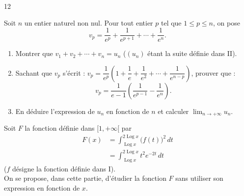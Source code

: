 \documentclass{axiobac}
\begin{document}
\begin{probleme}{12}

Soit $n$ un entier naturel non nul. Pour tout entier $p$ tel que $1 \leqslant p \leqslant n$, on pose
\[
v_p = \frac{1}{e^p} + \frac{1}{e^{p+1}} + \cdots + \frac{1}{e^n} .
\]

\begin{enumerate}
    \item Montrer que $v_1 + v_2 + \cdots + v_n = u_n$ ($(u_n)$ étant la suite définie dans II).
    \item Sachant que $v_p$ s'écrit : $v_p = \dfrac{1}{e^p}\left(1 + \dfrac{1}{e} + \dfrac{1}{e^2} + \cdots + \dfrac{1}{e^{n-p}}\right)$, prouver que :
    \[
    v_p = \frac{1}{e - 1}\left(\frac{1}{e^{p-1}} - \frac{1}{e^n}\right) .
    \]
    \item En déduire l'expression de $u_n$ en fonction de $n$ et calculer $\displaystyle\lim_{n \to +\infty} u_n$.
\end{enumerate}


Soit $F$ la fonction définie dans $[1, +\infty[$ par
\[
\begin{aligned}
F(x) &= \int_{\operatorname{Log} x}^{2 \operatorname{Log} x} \big(f(t)\big)^2\,dt \\
     &= \int_{\operatorname{Log} x}^{2 \operatorname{Log} x} t^2 e^{-2t}\,dt
\end{aligned}
\]
($f$ désigne la fonction définie dans I). \\
On se propose, dans cette partie, d'étudier la fonction $F$ sans utiliser son expression en fonction de $x$.


\end{probleme}
\end{document}
